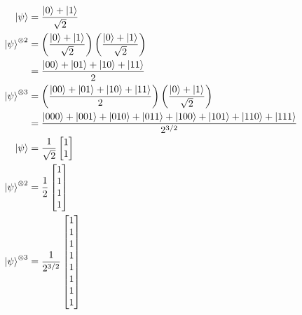 \documentclass{article}
\begin{document}
\begin{align*}
  \ket{\psi}             & = \frac{\ket{0} + \ket{1}}{\sqrt{2}}                                                                                   \\
  \ket{\psi}^{\otimes 2} & = \left( \frac{\ket{0} + \ket{1}}{\sqrt{2}} \right) \left( \frac{\ket{0} + \ket{1}}{\sqrt{2}} \right)                  \\
                         & = \frac{\ket{00} + \ket{01} + \ket{10} + \ket{11}}{2}                                                                  \\
  \ket{\psi}^{\otimes 3} & = \left( \frac{\ket{00} + \ket{01} + \ket{10} + \ket{11}}{2} \right) \left( \frac{\ket{0} + \ket{1}}{\sqrt{2}} \right) \\
                         & = \frac{\ket{000} + \ket{001} + \ket{010} + \ket{011} + \ket{100} + \ket{101} + \ket{110} + \ket{111}}{2^{3 / 2}}      \\
  \ket{\psi}             & = \frac{1}{\sqrt{2}} \begin{bmatrix}
                                                  1 \\
                                                  1
                                                \end{bmatrix}                                                                                    \\
  \ket{\psi}^{\otimes 2} & = \frac{1}{2} \begin{bmatrix}
                                           1 \\
                                           1 \\
                                           1 \\
                                           1
                                         \end{bmatrix}                                                                                           \\
  \ket{\psi}^{\otimes 3} & = \frac{1}{2^{3 / 2}} \begin{bmatrix}
                                                   1 \\
                                                   1 \\
                                                   1 \\
                                                   1 \\
                                                   1 \\
                                                   1 \\
                                                   1 \\
                                                   1
                                                 \end{bmatrix}
\end{align*}
\end{document}
